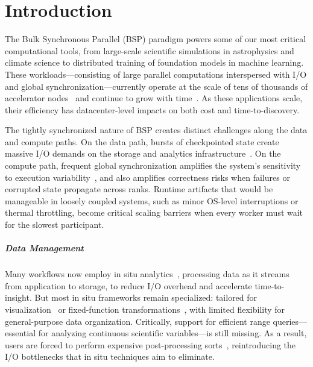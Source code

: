 
\chapter{Introduction}
\minitoc

The Bulk Synchronous Parallel (BSP) paradigm powers some of our most critical computational tools,
from large-scale scientific simulations in astrophysics and climate science to distributed training
of foundation models in machine learning.
These workloads---consisting of large parallel computations interspersed with I/O and global
synchronization---currently operate at the scale of tens of thousands of accelerator
nodes~\cite{Das2023:LargeScale,Stock2024:LargeScale,Gratt2024:Llama3Scale,:LlamaScale} and
continue to grow with time~\cite{Rahma2024:MLScale}.
As these applications scale, their efficiency has datacenter-level impacts on both cost and
time-to-discovery.

The tightly synchronized nature of BSP creates distinct challenges along the data and compute
paths.
On the data path, bursts of checkpointed state create massive I/O demands on the storage and
analytics
infrastructure~\cite{Jones2012:Checkpointing,Eisen2022:Checkpoint,Lian2025:UniversalCheckpointing}.
On the compute path, frequent global synchronization amplifies the system's sensitivity to
execution
variability~\cite{Hoefl2010:Noise,Petri2003:Missing,Yildi2016:IONoise,Kocol2018:Varbench,Acun2016:Variation},
and also amplifies correctness risks when failures or corrupted state propagate across ranks.
Runtime artifacts that would be manageable in loosely coupled systems, such as minor OS-level
interruptions or thermal throttling, become critical scaling barriers when every worker must wait
for the slowest participant.

\paragraph{Data Management}
Many workflows now employ in situ
analytics~\cite{Bauer2016:SituMethodsInfrastructures,Child2020:TerminologySituVisualization},
processing data as it streams from application to storage, to reduce I/O overhead and accelerate
time-to-insight.
But most in situ frameworks remain specialized: tailored for
visualization~\cite{Larse2022:Ascent,Ayach2015:Catalyst,Ibrah2019:InteractiveSituVisualization,Gross2021:LightweightInterfaceSitu,Larse2017:ALPINE}
or fixed-function transformations~\cite{Eisen2025:ADIOS}, with limited flexibility for
general-purpose data organization.
Critically, support for efficient range queries---essential for analyzing continuous scientific
variables---is still missing.
As a result, users are forced to perform expensive post-processing
sorts~\cite{Dong2016,Sunda2013:HykSort,Rasmu2011:TritonSort}, reintroducing the I/O bottlenecks
that in situ techniques aim to eliminate.

